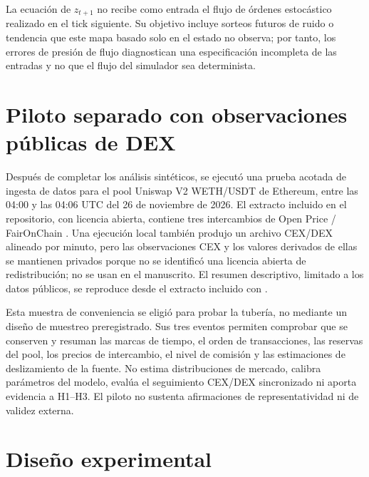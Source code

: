 La ecuación de $z_{t+1}$ no recibe como entrada el flujo de órdenes estocástico realizado en el tick siguiente. Su objetivo incluye sorteos futuros de ruido o tendencia que este mapa basado solo en el estado no observa; por tanto, los errores de presión de flujo diagnostican una especificación incompleta de las entradas y no que el flujo del simulador sea determinista.

\section{Piloto separado con observaciones públicas de DEX}
\label{sec:dex-pilot-method}

Después de completar los análisis sintéticos, se ejecutó una prueba acotada de ingesta de datos para el pool Uniswap V2 WETH/USDT de Ethereum, entre las 04:00 y las 04:06 UTC del 26 de noviembre de 2026. El extracto incluido en el repositorio, con licencia abierta, contiene tres intercambios de Open Price / FairOnChain \cite{openpriceethereum2026}. Una ejecución local también produjo un archivo CEX/DEX alineado por minuto, pero las observaciones CEX y los valores derivados de ellas se mantienen privados porque no se identificó una licencia abierta de redistribución; no se usan en el manuscrito. El resumen descriptivo, limitado a los datos públicos, se reproduce desde el extracto incluido con .

Esta muestra de conveniencia se eligió para probar la tubería, no mediante un diseño de muestreo preregistrado. Sus tres eventos permiten comprobar que se conserven y resuman las marcas de tiempo, el orden de transacciones, las reservas del pool, los precios de intercambio, el nivel de comisión y las estimaciones de deslizamiento de la fuente. No estima distribuciones de mercado, calibra parámetros del modelo, evalúa el seguimiento CEX/DEX sincronizado ni aporta evidencia a H1--H3. El piloto no sustenta afirmaciones de representatividad ni de validez externa.

\section{Diseño experimental}

